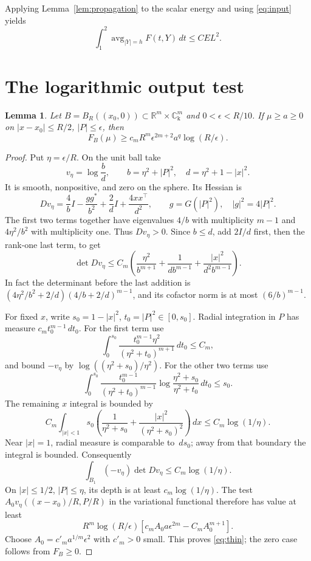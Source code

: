 \documentclass[11pt]{article}
\newtheorem{lemma}{Lemma}
\numberwithin{equation}{section}
\newcommand{\R}{\mathbb R}
\newcommand{\C}{\mathbb C}
\newcommand{\dd}{\,d}
\begin{document}
Applying Lemma~\ref{lem:propagation} to the scalar energy and using
\eqref{eq:input} yields
\begin{equation}\label{eq:totalupper}
 \int_1^2\operatorname{avg}_{|Y|=h}F(t,Y)\dd t\le C E L^2.
\end{equation}

\section{The logarithmic output test}

\begin{lemma}\label{lem:thin}
Let $B=B_R((x_0,0))\subset\R^m\times\C_{\mathrm{k}}^m$ and
$0<\epsilon<R/10$. If $\mu\ge a\ge0$ on
$|x-x_0|\le R/2$, $|P|\le\epsilon$, then
\begin{equation}\label{eq:thin}
 F_B(\mu)\ge c_mR^m\epsilon^{2m+2}a^q\log(R/\epsilon).
\end{equation}
\end{lemma}
\begin{proof}
Put $\eta=\epsilon/R$. On the unit ball take
\[
 v_\eta=\log\frac{b}{d},\qquad
 b=\eta^2+|P|^2,\quad d=\eta^2+1-|x|^2.
\]
It is smooth, nonpositive, and zero on the sphere. Its Hessian is
\[
 Dv_\eta=\frac4b I-\frac{gg^*}{b^2}
                    +\frac2d I+\frac{4xx^{\top}}{d^2},
 \qquad g=G(|P|^2),\quad |g|^2=4|P|^2.
\]
The first two terms together have eigenvalues $4/b$ with multiplicity
$m-1$ and $4\eta^2/b^2$ with multiplicity one. Thus $Dv_\eta>0$.
Since $b\le d$, add $2I/d$ first, then the rank-one last term, to get
\[
 \det Dv_\eta\le C_m\left(
 \frac{\eta^2}{b^{m+1}}+
 \frac1{d b^{m-1}}+\frac{|x|^2}{d^2b^{m-1}}\right).
\]
In fact the determinant before the last addition is
$(4\eta^2/b^2+2/d)(4/b+2/d)^{m-1}$, and its cofactor norm is at
most $(6/b)^{m-1}$.

For fixed $x$, write $s_0=1-|x|^2$, $t_0=|P|^2\in[0,s_0]$.
Radial integration in $P$ has measure $c_mt_0^{m-1}\dd t_0$.
For the first term use
\[
 \int_0^{s_0}\frac{t_0^{m-1}\eta^2}{(\eta^2+t_0)^{m+1}}\dd t_0
 \le C_m,
\]
and bound $-v_\eta$ by $\log((\eta^2+s_0)/\eta^2)$.
For the other two terms use
\[
 \int_0^{s_0}\frac{t_0^{m-1}}{(\eta^2+t_0)^{m-1}}
       \log\frac{\eta^2+s_0}{\eta^2+t_0}\dd t_0\le s_0.
\]
The remaining $x$ integral is bounded by
\[
 C_m\int_{|x|<1}s_0\left(\frac1{\eta^2+s_0}
                  +\frac{|x|^2}{(\eta^2+s_0)^2}\right)\dd x
 \le C_m\log(1/\eta).
\]
Near $|x|=1$, radial measure is comparable to $\dd s_0$; away from
that boundary the integral is bounded. Consequently
\[
 \int_{B_1}(-v_\eta)\det Dv_\eta\le C_m\log(1/\eta).
\]
On $|x|\le1/2$, $|P|\le\eta$, its depth is at least
$c_m\log(1/\eta)$.
The test $A_0v_\eta((x-x_0)/R,P/R)$ in the variational functional
therefore has value at least
\[
 R^m\log(R/\epsilon)
          [c_m A_0a\epsilon^{2m}-C_m A_0^{m+1}].
\]
Choose $A_0=c'_ma^{1/m}\epsilon^2$ with $c'_m>0$ small.
This proves \eqref{eq:thin}; the zero case follows from $F_B\ge0$.
\end{proof}
\end{document}
